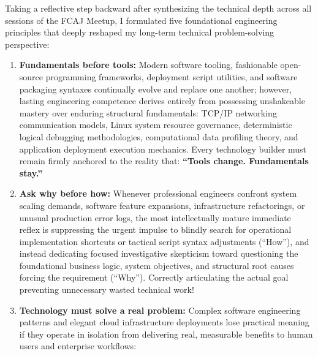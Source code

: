 Taking a reflective step backward after synthesizing the technical depth
across all sessions of the FCAJ Meetup, I formulated five foundational
engineering principles that deeply reshaped my long-term technical
problem-solving perspective:

\begin{enumerate}
\def\labelenumi{\arabic{enumi}.}
\tightlist
\item
  \textbf{Fundamentals before tools:} Modern software tooling,
  fashionable open-source programming frameworks, deployment script
  utilities, and software packaging syntaxes continually evolve and
  replace one another; however, lasting engineering competence derives
  entirely from possessing unshakeable mastery over enduring structural
  fundamentals: TCP/IP networking communication models, Linux system
  resource governance, deterministic logical debugging methodologies,
  computational data profiling theory, and application deployment
  execution mechanics. Every technology builder must remain firmly
  anchored to the reality that: \textbf{``Tools change. Fundamentals
  stay.''}
\item
  \textbf{Ask why before how:} Whenever professional engineers confront
  system scaling demands, software feature expansions, infrastructure
  refactorings, or unusual production error logs, the most
  intellectually mature immediate reflex is suppressing the urgent
  impulse to blindly search for operational implementation shortcuts or
  tactical script syntax adjustments (``How''), and instead dedicating
  focused investigative skepticism toward questioning the foundational
  business logic, system objectives, and structural root causes forcing
  the requirement (``Why''). Correctly articulating the actual goal
  preventing unnecessary wasted technical work!
\item
  \textbf{Technology must solve a real problem:} Complex software
  engineering patterns and elegant cloud infrastructure deployments lose
  practical meaning if they operate in isolation from delivering real,
  measurable benefits to human users and enterprise workflows:


\end{enumerate}
